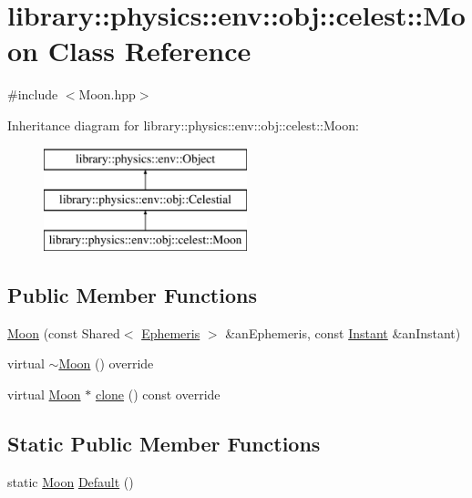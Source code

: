 \hypertarget{classlibrary_1_1physics_1_1env_1_1obj_1_1celest_1_1_moon}{}\section{library\+:\+:physics\+:\+:env\+:\+:obj\+:\+:celest\+:\+:Moon Class Reference}
\label{classlibrary_1_1physics_1_1env_1_1obj_1_1celest_1_1_moon}


{\ttfamily \#include $<$Moon.\+hpp$>$}

Inheritance diagram for library\+:\+:physics\+:\+:env\+:\+:obj\+:\+:celest\+:\+:Moon\+:\begin{figure}[H]
\begin{center}
\leavevmode
\includegraphics[height=3.000000cm]{classlibrary_1_1physics_1_1env_1_1obj_1_1celest_1_1_moon}
\end{center}
\end{figure}
\subsection*{Public Member Functions}
\begin{DoxyCompactItemize}
\item 
\hyperlink{classlibrary_1_1physics_1_1env_1_1obj_1_1celest_1_1_moon_a14666407b72dbdc6632fe6f735654432}{Moon} (const Shared$<$ \hyperlink{classlibrary_1_1physics_1_1env_1_1_ephemeris}{Ephemeris} $>$ \&an\+Ephemeris, const \hyperlink{classlibrary_1_1physics_1_1time_1_1_instant}{Instant} \&an\+Instant)
\item 
virtual \hyperlink{classlibrary_1_1physics_1_1env_1_1obj_1_1celest_1_1_moon_aef4e99355b923e8c41ec12237bf41ecb}{$\sim$\+Moon} () override
\item 
virtual \hyperlink{classlibrary_1_1physics_1_1env_1_1obj_1_1celest_1_1_moon}{Moon} $\ast$ \hyperlink{classlibrary_1_1physics_1_1env_1_1obj_1_1celest_1_1_moon_a9d922ab338809a6c1052edbe11ce3e60}{clone} () const override
\end{DoxyCompactItemize}
\subsection*{Static Public Member Functions}
\begin{DoxyCompactItemize}
\item 
static \hyperlink{classlibrary_1_1physics_1_1env_1_1obj_1_1celest_1_1_moon}{Moon} \hyperlink{classlibrary_1_1physics_1_1env_1_1obj_1_1celest_1_1_moon_af9d3870d1a42118ea07d8c25b3c7da52}{Default} ()
\end{DoxyCompactItemize}
